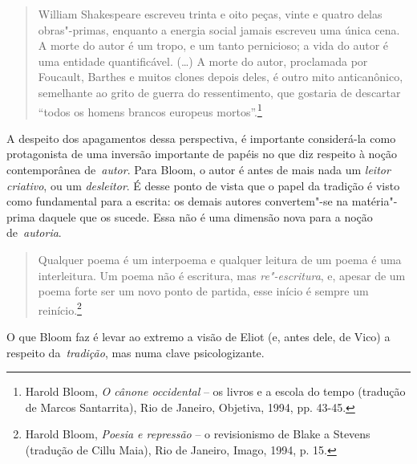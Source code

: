 \begin{quote}
William Shakespeare escreveu trinta e oito peças, vinte e quatro delas
obras"-primas, enquanto a energia social jamais escreveu uma única cena.
A morte do autor é um tropo, e um tanto pernicioso; a vida do autor é
uma entidade quantificável. (\ldots{}) A morte do autor, proclamada por
Foucault, Barthes e muitos clones depois deles, é outro mito
anticanônico, semelhante ao grito de guerra do ressentimento, que
gostaria de descartar ``todos os homens brancos europeus
mortos''.\footnote{Harold Bloom, \emph{O cânone occidental} -- os livros
  e a escola do tempo (tradução de Marcos Santarrita), Rio de Janeiro,
  Objetiva, 1994, pp. 43-45.}
\end{quote}

A despeito dos apagamentos dessa perspectiva, é importante considerá-la
como protagonista de uma inversão importante de papéis no que diz
respeito à noção contemporânea de~\emph{autor}. Para Bloom, o autor é
antes de mais nada um \emph{leitor criativo}, ou um \emph{desleitor}. É
desse ponto de vista que o papel da tradição é visto como fundamental
para a escrita: os demais autores convertem"-se na matéria"-prima daquele
que os sucede. Essa não é uma dimensão nova para a noção
de~\emph{autoria}.

\begin{quote}
Qualquer poema é um interpoema e qualquer leitura de um poema é uma
interleitura. Um poema não é escritura, mas \emph{re"-escritura}, e,
apesar de um poema forte ser um novo ponto de partida, esse início é
sempre um reinício.\footnote{Harold Bloom, \emph{Poesia e repressão} --
  o revisionismo de Blake a Stevens (tradução de Cillu Maia), Rio de
  Janeiro, Imago, 1994, p. 15.}
\end{quote}

O que Bloom faz é levar ao extremo a visão de Eliot (e, antes dele, de
Vico) a respeito da~\emph{tradição}, mas numa clave psicologizante.

